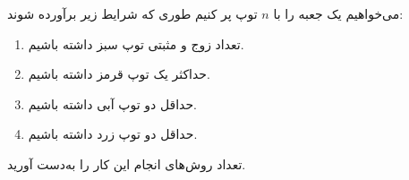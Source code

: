 \EXERCISE
می‌خواهیم یک جعبه را با
$n$
توپ پر کنیم طوری که شرایط زیر برآورده شوند:
\begin{enumerate}
\item
تعداد زوج و مثبتی توپ سبز داشته باشیم.
\item
حداکثر یک توپ قرمز داشته باشیم.
\item
حداقل دو توپ آبی داشته باشیم.
\item
حداقل دو توپ زرد داشته باشیم.
\end{enumerate}
تعداد روش‌های انجام این کار را به‌دست آورید.